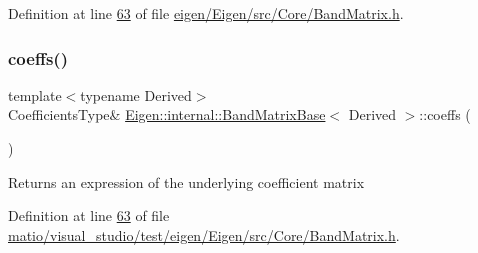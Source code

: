 Definition at line \hyperlink{eigen_2_eigen_2src_2_core_2_band_matrix_8h_source_l00063}{63} of file \hyperlink{eigen_2_eigen_2src_2_core_2_band_matrix_8h_source}{eigen/\+Eigen/src/\+Core/\+Band\+Matrix.\+h}.

\mbox{\label{class_eigen_1_1internal_1_1_band_matrix_base_ab296a77fa3ac9c7618957b01c7de0a35}} 
\subsubsection{\texorpdfstring{coeffs()}{coeffs()}\hspace{0.1cm}{\footnotesize\ttfamily [4/4]}}
{\footnotesize\ttfamily template$<$typename Derived$>$ \\
Coefficients\+Type\& \hyperlink{class_eigen_1_1internal_1_1_band_matrix_base}{Eigen\+::internal\+::\+Band\+Matrix\+Base}$<$ Derived $>$\+::coeffs (\begin{DoxyParamCaption}{ }\end{DoxyParamCaption})\hspace{0.3cm}{\ttfamily [inline]}}

\begin{DoxyReturn}{Returns}
an expression of the underlying coefficient matrix 
\end{DoxyReturn}


Definition at line \hyperlink{matio_2visual__studio_2test_2eigen_2_eigen_2src_2_core_2_band_matrix_8h_source_l00063}{63} of file \hyperlink{matio_2visual__studio_2test_2eigen_2_eigen_2src_2_core_2_band_matrix_8h_source}{matio/visual\+\_\+studio/test/eigen/\+Eigen/src/\+Core/\+Band\+Matrix.\+h}.

\mbox{\label{class_eigen_1_1internal_1_1_band_matrix_base_aca78a4990b6827b0b3086e28e6ae4257}} 
